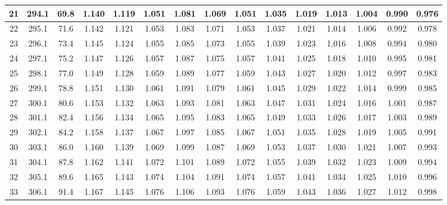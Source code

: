 \documentclass[12pt,a4paper,twoside]{article}
\begin{document}
\begin{center}
\begin{longtable}{ c c c | c c c c c c c c c c c c}
 21 & 294.1 & 69.8 & 1.140 & 1.119 & 1.051 & 1.081 & 1.069 & 1.051 & 1.035 & 1.019 & 1.013 & 1.004 & 0.990 & 0.976 \\ \hline   
 
 22 & 295.1 & 71.6 & 1.142 & 1.121 & 1.053 & 1.083 & 1.071 & 1.053 & 1.037 & 1.021 & 1.014 & 1.006 & 0.992 & 0.978 \\ \hline   
 
 23 & 296.1 & 73.4 & 1.145 & 1.124 & 1.055 & 1.085 & 1.073 & 1.055 & 1.039 & 1.023 & 1.016 & 1.008 & 0.994 & 0.980 \\ \hline   
 
 24 & 297.1 & 75.2 & 1.147 & 1.126 & 1.057 & 1.087 & 1.075 & 1.057 & 1.041 & 1.025 & 1.018 & 1.010 & 0.995 & 0.981 \\ \hline   
 
 25 & 298.1 & 77.0 & 1.149 & 1.128 & 1.059 & 1.089 & 1.077 & 1.059 & 1.043 & 1.027 & 1.020 & 1.012 & 0.997 & 0.983 \\ \hline   
 
 26 & 299.1 & 78.8 & 1.151 & 1.130 & 1.061 & 1.091 & 1.079 & 1.061 & 1.045 & 1.029 & 1.022 & 1.014 & 0.999 & 0.985 \\ \hline   
 
 27 & 300.1 & 80.6 & 1.153 & 1.132 & 1.063 & 1.093 & 1.081 & 1.063 & 1.047 & 1.031 & 1.024 & 1.016 & 1.001 & 0.987 \\ \hline   
 
 28 & 301.1 & 82.4 & 1.156 & 1.134 & 1.065 & 1.095 & 1.083 & 1.065 & 1.049 & 1.033 & 1.026 & 1.017 & 1.003 & 0.989 \\ \hline   
 
 29 & 302.1 & 84.2 & 1.158 & 1.137 & 1.067 & 1.097 & 1.085 & 1.067 & 1.051 & 1.035 & 1.028 & 1.019 & 1.005 & 0.991 \\ \hline   
 
 30 & 303.1 & 86.0 & 1.160 & 1.139 & 1.069 & 1.099 & 1.087 & 1.069 & 1.053 & 1.037 & 1.030 & 1.021 & 1.007 & 0.993 \\ \hline   
 
 31 & 304.1 & 87.8 & 1.162 & 1.141 & 1.072 & 1.101 & 1.089 & 1.072 & 1.055 & 1.039 & 1.032 & 1.023 & 1.009 & 0.994 \\ \hline   
 
 32 & 305.1 & 89.6 & 1.165 & 1.143 & 1.074 & 1.104 & 1.091 & 1.074 & 1.057 & 1.041 & 1.034 & 1.025 & 1.010 & 0.996 \\ \hline   
 
 33 & 306.1 & 91.4 & 1.167 & 1.145 & 1.076 & 1.106 & 1.093 & 1.076 & 1.059 & 1.043 & 1.036 & 1.027 & 1.012 & 0.998 \\ \hline   
 

\end{longtable}
\end{center}
\end{document}

